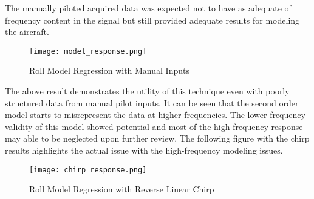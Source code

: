 The manually piloted acquired data was expected not to have as adequate of frequency content in the signal but still provided adequate results for modeling the aircraft.

\begin{figure}[!h]
 \centering
  \texttt{[image: model\_response.png]}
  \caption{Roll Model Regression with Manual Inputs}
  \label{fig:roll_model}
\end{figure}

The above result demonstrates the utility of this technique even with poorly structured data from manual pilot inputs.  It can be seen that the second order model starts to misrepresent the data at higher frequencies.  The lower frequency validity of this model showed potential and most of the high-frequency response may able to be neglected upon further review.  The following figure with the chirp results highlights the actual issue with the high-frequency modeling issues.

\begin{figure}[!h]
 \centering
  \texttt{[image: chirp\_response.png]}
  \caption{Roll Model Regression with Reverse Linear Chirp}
  \label{fig:chirp_model}
\end{figure}

